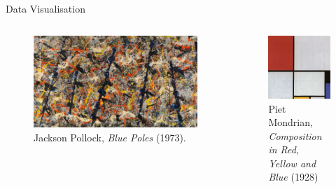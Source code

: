 \documentclass[
  ignorenonframetext,
]{beamer}
\begin{document}
\begin{frame}{Data Visualisation}
\protect\hypertarget{data-visualisation}{}
\begin{columns}[T]
\begin{column}{0.48\textwidth}
\begin{figure}
\centering
\includegraphics{../manuscript/resources/06_visualisation/bluepoles.jpg}
\caption{Jackson Pollock, \emph{Blue Poles} (1973).}
\end{figure}
\end{column}

\begin{column}{0.48\textwidth}
\begin{figure}
\centering
\includegraphics{../manuscript/resources/06_visualisation/mondrian.jpg}
\caption{Piet Mondrian, \emph{Composition in Red, Yellow and Blue}
(1928)}
\end{figure}
\end{column}
\end{columns}
\end{frame}
\end{document}
